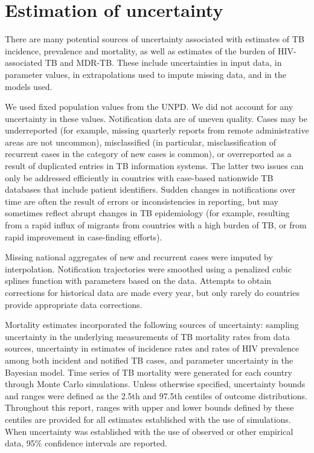 \section{Estimation of uncertainty}

There are many potential sources of uncertainty associated with estimates of TB incidence, prevalence and mortality, as well as estimates of the burden of HIV-associated TB and MDR-TB. These include uncertainties in input data, in parameter values, in extrapolations used to impute missing data, and in the models used. 

We used fixed population values from the UNPD. We did not account for any uncertainty in these values.  
Notification data are of uneven quality. Cases may be underreported (for example, missing quarterly reports from remote administrative areas are not uncommon), misclassified (in particular, misclassification of recurrent cases in the category of new cases is common), or overreported as a result of duplicated entries in TB information systems. The latter two issues can only be addressed efficiently in countries with case-based nationwide TB databases that include patient identifiers. Sudden changes in notifications over time are often the result of errors or inconsistencies in reporting, but may sometimes reflect abrupt changes in TB epidemiology (for example, resulting from a rapid influx of migrants from countries with a high burden of TB, or from rapid improvement in case-finding efforts). 

Missing national aggregates of new and recurrent cases were imputed by interpolation. Notification trajectories were smoothed using a penalized cubic splines function with parameters based on the data. Attempts to obtain corrections for historical data are made every year, but only rarely do countries provide appropriate data corrections. 

Mortality estimates incorporated the following sources of uncertainty: sampling uncertainty in the underlying measurements of TB mortality rates from data sources, uncertainty in estimates of incidence rates and rates of HIV prevalence among both incident and notified TB cases, and parameter uncertainty in the Bayesian model. Time series of TB mortality were generated for each country through Monte Carlo simulations. 
Unless otherwise specified, uncertainty bounds and ranges were defined as the 2.5th and 97.5th centiles of outcome distributions. Throughout this report, ranges with upper and lower bounds defined by these centiles are provided for all estimates established with the use of simulations. When uncertainty was established with the use of observed or other empirical data, 95\% confidence intervals are reported.
 
